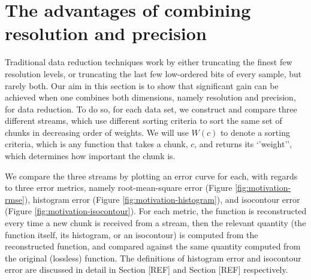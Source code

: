 \section{The advantages of combining resolution and precision}
\label{sec:motivation}

Traditional data reduction techniques work by either truncating the finest few resolution levels, or
truncating the last few low-ordered bits of every sample, but rarely both. Our aim in this section
is to show that significant gain can be achieved when one combines both dimensions, namely
resolution and precision, for data reduction. To do so, for each data set, we construct and compare
three different streams, which use different sorting criteria to sort the same set of chunks in
decreasing order of weights. We will use $W(c)$ to denote a sorting criteria, which is any function
that takes a chunk, $c$, and returns its `'weight'', which determines how important the chunk is.

We compare the three streams by plotting an error curve for each, with regards to three error
metrics, namely root-mean-square error (Figure \ref{fig:motivation-rmse}), histogram error (Figure
\ref{fig:motivation-histogram}), and isocontour error (Figure \ref{fig:motivation-isocontour}). For
each metric, the function is reconstructed every time a new chunk is received from a stream, then
the relevant quantity (the function itself, its histogram, or an isocontour) is computed from the
reconstructed function, and compared against the same quantity computed from the original (lossless)
function. The definitions of histogram error and isocontour error are discussed in detail in Section
[REF] and Section [REF] respectively.

